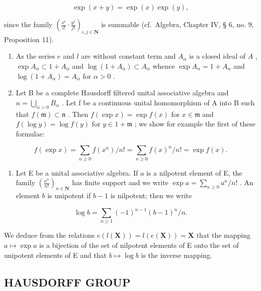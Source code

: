 \[
\exp (x + y) = \exp (x) \exp (y),
\]

since the family \(\left(\frac{x^i}{i!}\cdot \frac{y^j}{j!}\right)_{i,j\in \mathbf{N}}\) is summable (cf.~Algebra, Chapter IV, § 6, no. 9, Proposition 11).

\begin{enumerate}
\def\labelenumi{(\arabic{enumi})}
\setcounter{enumi}{1}
\item
  As the series \(e\) and \(l\) are without constant term and \(A_{\alpha}\) is a closed ideal of \(A\) , \(\exp A_{\alpha} \subset 1 + A_{\alpha}\) and \(\log (1 + A_{\alpha}) \subset A_{\alpha}\) whence \(\exp A_{\alpha} = 1 + A_{\alpha}\) and \(\log (1 + A_{\alpha}) = A_{\alpha}\) for \(\alpha > 0\) .
\item
  Let B be a complete Hausdorff filtered unital associative algebra and \(n = \bigcup_{\alpha > 0} B_{\alpha}\) . Let f be a continuous unital homomorphism of A into B such that \(f(\mathfrak{m}) \subset \mathfrak{n}\) . Then \(f(\exp x) = \exp f(x)\) for \(x \in \mathfrak{m}\) and \(f(\log y) = \log f(y)\) for \(y \in 1 + \mathfrak{m}\) ; we show for example the first of these formulae:
\end{enumerate}

\[
f (\exp x) = \sum_ {n \geqslant 0} f (x ^ {n}) / n! = \sum_ {n \geqslant 0} f (x) ^ {n} / n! = \exp f (x).
\]

\begin{enumerate}
\def\labelenumi{(\arabic{enumi})}
\setcounter{enumi}{3}
\tightlist
\item
  Let E be a unital associative algebra. If \(a\) is a nilpotent element of E, the family \(\left(\frac{a^n}{n!}\right)_{n\in \mathbf{N}}\) has finite support and we write \(\exp a = \sum_{n\geqslant 0}a^n /n!\) . An element \(b\) is unipotent if \(b - 1\) is nilpotent; then we write
\end{enumerate}

\[
\log b = \sum_ {n \geqslant 1} (- 1) ^ {n - 1} (b - 1) ^ {n} / n.
\]

We deduce from the relations \(e(l(\mathbf{X})) = l(e(\mathbf{X})) = \mathbf{X}\) that the mapping \(a \mapsto \exp a\) is a bijection of the set of nilpotent elements of E onto the set of unipotent elements of E and that \(b \mapsto \log b\) is the inverse mapping.

\subsection{HAUSDORFF GROUP}


